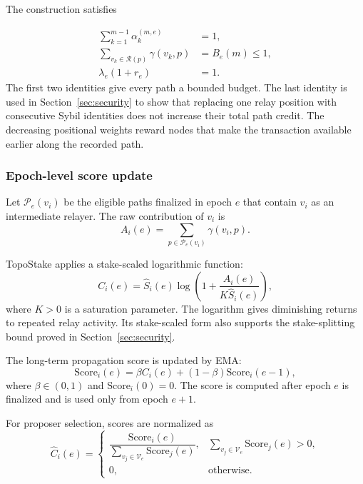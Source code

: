 \documentclass[lettersize,journal]{IEEEtran}
\begin{document}
The construction satisfies


\begin{align}
\sum_{k=1}^{m-1}\alpha_k^{(m,e)} &= 1, \label{eq:path_credit_1} \\
\sum_{v_k\in\mathcal{R}(p)} \gamma(v_k,p) &= B_e(m)\leq1, \label{eq:path_credit_2} \\
\lambda_e(1+r_e) &= 1. \label{eq:path_credit_3}
\end{align}
The first two identities give every path a bounded budget.
The last identity is used in Section~\ref{sec:security} to show that replacing one relay position with consecutive Sybil identities does not increase their total path credit.
The decreasing positional weights reward nodes that make the transaction available earlier along the recorded path.

\subsubsection{Epoch-level score update}
Let $\mathcal{P}_e(v_i)$ be the eligible paths finalized in epoch $e$ that contain $v_i$ as an intermediate relayer.
The raw contribution of $v_i$ is
\begin{equation}
\label{eq:raw_epoch_credit}
A_i(e)
=
\sum_{p\in\mathcal{P}_e(v_i)}
\gamma(v_i,p).
\end{equation}

TopoStake applies a stake-scaled logarithmic function:
\begin{equation}
\label{eq:saturated_credit}
C_i(e)
=
\hat S_i(e)
\log\left(
1+
\frac{A_i(e)}
{K\hat S_i(e)}
\right),
\end{equation}
where $K>0$ is a saturation parameter.
The logarithm gives diminishing returns to repeated relay activity.
Its stake-scaled form also supports the stake-splitting bound proved in Section~\ref{sec:security}.

The long-term propagation score is updated by EMA:
\begin{equation}
\label{eq:score_ema}
\mathrm{Score}_i(e)
=
\beta C_i(e)
+
(1-\beta)\mathrm{Score}_i(e-1),
\end{equation}
where $\beta\in(0,1)$ and $\mathrm{Score}_i(0)=0$.
The score is computed after epoch $e$ is finalized and is used only from epoch $e+1$.

For proposer selection, scores are normalized as
\begin{equation}
\label{eq:normalized_score}
\hat C_i(e)
=
\begin{cases}
\dfrac{\mathrm{Score}_i(e)}
{\sum_{v_j\in\mathcal{V}_e}\mathrm{Score}_j(e)},
&
\sum_{v_j\in\mathcal{V}_e}\mathrm{Score}_j(e)>0,\\[1.2ex]
0, & \text{otherwise}.
\end{cases}
\end{equation}
\end{document}

